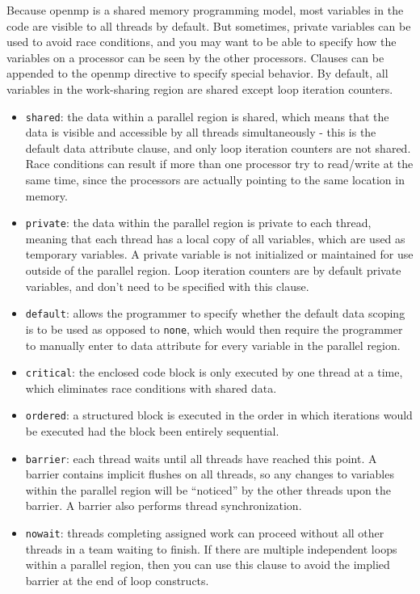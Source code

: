 \documentclass[10pt]{article}
\newcounter{subsubsubsection}[subsubsection]
\begin{document}
\begin{flushleft}
Because \gls{openmp} is a shared memory programming model, most variables in the code are visible to all threads by default. But sometimes, private variables can be used to avoid race conditions, and you may want to be able to specify how the variables on a processor can be seen by the other processors. Clauses can be appended to the \gls{openmp} directive to specify special behavior. By default, all variables in the work-sharing region are shared except loop iteration counters.


\begin{itemize}
\item {\tt shared}: the data within a parallel region is shared, which means that the data is visible and accessible by all threads simultaneously - this is the default data attribute clause, and only loop iteration counters are not shared. Race conditions can result if more than one processor try to read/write at the same time, since the processors are actually pointing to the same location in memory.
\item {\tt private}: the data within the parallel region is private to each thread, meaning that each thread has a local copy of all variables, which are used as temporary variables. A private variable is not initialized or maintained for use outside of the parallel region. Loop iteration counters are by default private variables, and don't need to be specified with this clause.
\item {\tt default}: allows the programmer to specify whether the default data scoping is to be used as opposed to {\tt none}, which would then require the programmer to manually enter to data attribute for every variable in the parallel region. 
\end{itemize}


\begin{itemize}
\item {\tt critical}: the enclosed code block is only executed by one thread at a time, which eliminates race conditions with shared data.
\item {\tt ordered}: a structured block is executed in the order in which iterations would be executed had the block been entirely sequential.
\item {\tt barrier}: each thread waits until all threads have reached this point. A barrier contains implicit flushes on all threads, so any changes to variables within the parallel region will be ``noticed'' by the other threads upon the barrier. A barrier also performs thread synchronization.
\item {\tt nowait}: threads completing assigned work can proceed without all other threads in a team waiting to finish. If there are multiple independent loops within a parallel region, then you can use this clause to avoid the implied barrier at the end of loop constructs.
\end{itemize}


\end{flushleft}
\end{document}

